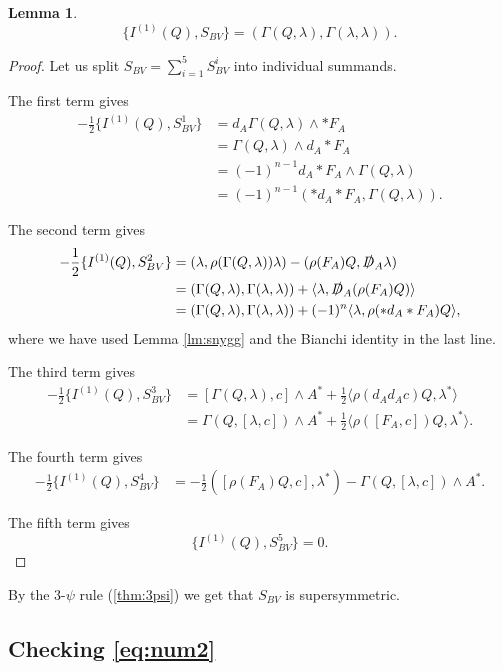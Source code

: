 \documentclass[12pt]{amsart}
\newcommand{\sD}{\slashed{D}}
\newtheorem{lm}[thm]{Lemma}
\begin{document}
\begin{lm}
\[\{I^{(1)}(Q), S_{BV}\} = (\Gamma(Q, \lambda), \Gamma(\lambda, \lambda)).\]
\end{lm}
\begin{proof}
Let us split $S_{BV} = \sum_{i=1}^5 S_{BV}^i$ into individual summands.

The first term gives
\begin{align*}
-\frac{1}{2}\{I^{(1)}(Q), S_{BV}^1\} &= d_A \Gamma(Q, \lambda)\wedge \ast F_A\\
&= \Gamma(Q, \lambda)\wedge d_A \ast F_A \\
&= (-1)^{n-1} d_A\ast F_A\wedge \Gamma(Q, \lambda) \\
&= (-1)^{n-1} (\ast d_A \ast F_A, \Gamma(Q, \lambda)).
\end{align*}

The second term gives
\begin{align*}
-\frac{1}{2}\{I^{(1)}(Q), S_{BV}^2\} &= (\lambda, \rho(\Gamma(Q, \lambda))\lambda) -(\rho(F_A) Q, \sD_A\lambda) \\
&= (\Gamma(Q, \lambda), \Gamma(\lambda, \lambda)) +\langle\lambda, \sD_A(\rho(F_A) Q)\rangle \\
&= (\Gamma(Q, \lambda), \Gamma(\lambda, \lambda)) + (-1)^n \langle\lambda, \rho(\ast d_A\ast F_A) Q\rangle,
\end{align*}
where we have used Lemma \cref{lm:snygg} and the Bianchi identity in the last line.

The third term gives
\begin{align*}
-\frac{1}{2}\{I^{(1)}(Q), S_{BV}^3\} &= [\Gamma(Q, \lambda), c]\wedge A^* + \frac{1}{2}\langle\rho(d_A d_A c)Q, \lambda^*\rangle \\
&= \Gamma(Q, [\lambda, c])\wedge A^* + \frac{1}{2}\langle\rho([F_A, c]) Q, \lambda^*\rangle.
\end{align*}

The fourth term gives
\begin{align*}
-\frac{1}{2}\{I^{(1)}(Q), S_{BV}^4\} &= -\frac{1}{2}([\rho(F_A) Q, c], \lambda^*) - \Gamma(Q, [\lambda, c])\wedge A^*.
\end{align*}

The fifth term gives
\[\{I^{(1)}(Q), S_{BV}^5\} = 0.\]
\end{proof}

By the 3-$\psi$ rule (\cref{thm:3psi}) we get that $S_{BV}$ is supersymmetric.

\subsection{Checking \eqref{eq:num2}}
\end{document}
